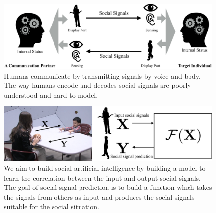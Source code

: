 %
\begin{figure}[t]
	\includegraphics[width=\linewidth]{ssp_fig/socialcomm}
	\caption{Humans communicate by transmitting signals by voice and body. The way humans encode and decodes social signals are poorly understood and hard to model. }
\label{fig:ssp_intro_flow}
\end{figure}
\begin{figure}[t]
	\centering
	\includegraphics[width=\linewidth]{ssp_fig/intro}
	\caption{We aim to build social artificial intelligence by building a model to learn the correlation between the input and output social signals. The goal of social signal prediction is to build a function which takes the signals from others as input and produces the social signals suitable for the social situation.}
	\label{fig:ssp_intro}
\end{figure}

